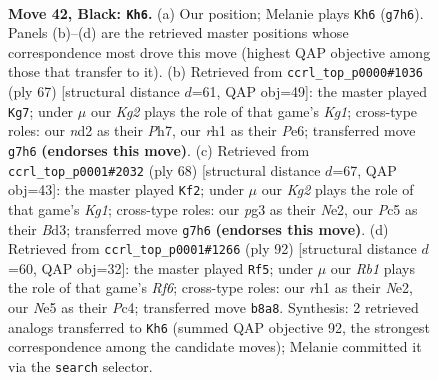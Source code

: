 \documentclass[11pt]{article}
\begin{document}
\clearpage

\begin{figure}[p]\centering
\begin{subfigure}{0.46\textwidth}\centering
\resizebox{\linewidth}{!}{%
\newchessgame
\chessboard[
  setfen={1r6/4r1k1/1p6/pBp1n3/P5p1/2P3P1/K1bN3P/4R1NR b - - 6 42},
  showmover=false,
  pgfstyle=straightmove, color=movearrow, markmove={g7-h6}
]}
\caption{}
\end{subfigure}\hfill
\begin{subfigure}{0.46\textwidth}\centering
\resizebox{\linewidth}{!}{%
\newchessgame
\chessboard[
  setfen={3r2k1/7p/p3p1p1/bp6/3nBP2/1P4PN/P6P/3R1K2 b - - 6 34},
  showmover=false,
  pgfstyle=straightmove, color=movearrow, markmove={g8-g7}
]}
\caption{}
\end{subfigure}
\\[4pt]
\begin{subfigure}{0.46\textwidth}\centering
\resizebox{\linewidth}{!}{%
\newchessgame
\chessboard[
  setfen={1r2n3/3b1p2/1P5p/3pk1p1/6P1/3B1P1P/4N3/1R4K1 w - - 1 35},
  showmover=false,
  pgfstyle=straightmove, color=movearrow, markmove={g1-f2}
]}
\caption{}
\end{subfigure}\hfill
\begin{subfigure}{0.46\textwidth}\centering
\resizebox{\linewidth}{!}{%
\newchessgame
\chessboard[
  setfen={2r3k1/1p1r4/p2pNR2/P3n2p/bPP5/7P/4N3/2R3K1 w - - 1 47},
  showmover=false,
  pgfstyle=straightmove, color=movearrow, markmove={f6-f5}
]}
\caption{}
\end{subfigure}
\caption{\textbf{Move 42, Black: \texttt{Kh6}.} (a) Our position; Melanie plays \texttt{Kh6} (\texttt{g7h6}). Panels (b)--(d) are the retrieved master positions whose correspondence most drove this move (highest QAP objective among those that transfer to it). (b) Retrieved from \texttt{ccrl\_top\_p0000\#1036} (ply 67) [structural distance $d$=61, QAP obj=49]: the master played \texttt{Kg7}; under $\mu$ our \emph{Kg2} plays the role of that game's \emph{Kg1}; cross-type roles: our \emph{n}d2 as their \emph{P}h7, our \emph{r}h1 as their \emph{P}e6; transferred move \texttt{g7h6} \textbf{(endorses this move)}. (c) Retrieved from \texttt{ccrl\_top\_p0001\#2032} (ply 68) [structural distance $d$=67, QAP obj=43]: the master played \texttt{Kf2}; under $\mu$ our \emph{Kg2} plays the role of that game's \emph{Kg1}; cross-type roles: our \emph{p}g3 as their \emph{N}e2, our \emph{P}c5 as their \emph{B}d3; transferred move \texttt{g7h6} \textbf{(endorses this move)}. (d) Retrieved from \texttt{ccrl\_top\_p0001\#1266} (ply 92) [structural distance $d$=60, QAP obj=32]: the master played \texttt{Rf5}; under $\mu$ our \emph{Rb1} plays the role of that game's \emph{Rf6}; cross-type roles: our \emph{r}h1 as their \emph{N}e2, our \emph{N}e5 as their \emph{P}c4; transferred move \texttt{b8a8}. Synthesis: 2 retrieved analogs transferred to \texttt{Kh6} (summed QAP objective 92, the strongest correspondence among the candidate moves); Melanie committed it via the \texttt{search} selector.}
\label{fig:thought-m83}
\end{figure}
\end{document}
